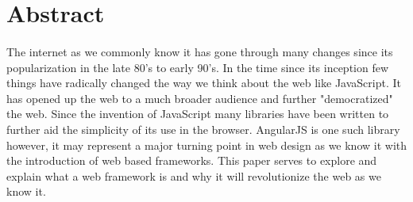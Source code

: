 \documentclass[
10pt, %
a4paper, %
oneside, %
headinclude,footinclude, %
BCOR5mm, %
]{scrartcl}
\title{\normalfont\spacedallcaps{Why AngularJS is the future of web design}} %
\author{\spacedlowsmallcaps{Michael Meding }} %
\date{} %
\begin{document}

\renewcommand{\sectionmark}[1]{\markright{\spacedlowsmallcaps{#1}}} %
\lehead{\mbox{\llap{\small\thepage\kern1em\color{halfgray} \vline}\color{halfgray}\hspace{0.5em}\rightmark\hfil}} %

\pagestyle{scrheadings} %


\maketitle %

\setcounter{tocdepth}{2} %

\tableofcontents %




\section*{Abstract} %

\paragraph{}
The internet as we commonly know it has gone through many changes since its popularization in the late 80's to early 90's.
In the time since its inception few things have radically changed the way we think about the web like JavaScript.
It has opened up the web to a much broader audience and further "democratized" the web.
Since the invention of JavaScript many libraries have been written to further aid the simplicity of its use in the browser.
AngularJS is one such library however, it may represent a major turning point in web design as we know it with the introduction of web based frameworks.
This paper serves to explore and explain what a web framework is and why it will revolutionize the web as we know it. 
\end{document}

